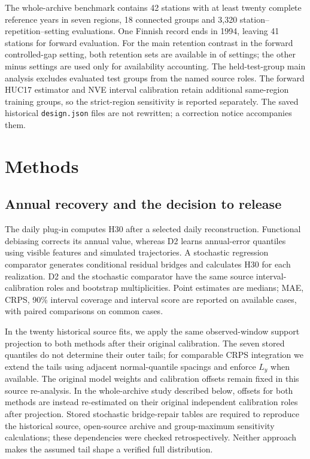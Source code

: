\documentclass[draft,linenumbers]{agujournal2025}
\begin{document}
The whole-archive benchmark contains 42 stations with at least twenty complete reference years in seven regions, 18 connected groups and 3,320 station--repetition--setting evaluations. One Finnish record ends in 1994, leaving 41 stations for forward evaluation. For the main retention contrast in the forward controlled-gap setting, both retention sets are available in \CCCohortCommon{} of \CCCohortAll{} settings; the other \CCCohortAll{} minus \CCCohortCommon{} settings are used only for availability accounting. The held-test-group main analysis excludes evaluated test groups from the named source roles. The forward HUC17 estimator and NVE interval calibration retain additional same-region training groups, so the strict-region sensitivity is reported separately. The saved historical \texttt{design.json} files are not rewritten; a correction notice accompanies them.



\section{Methods}
\subsection{Annual recovery and the decision to release}
The daily plug-in computes H30 after a selected daily reconstruction. Functional debiasing corrects its annual value, whereas D2 learns annual-error quantiles using visible features and simulated trajectories. A stochastic regression comparator generates conditional residual bridges and calculates H30 for each realization. D2 and the stochastic comparator have the same source interval-calibration roles and bootstrap multiplicities. Point estimates are medians; MAE, CRPS, 90\% interval coverage and interval score are reported on available cases, with paired comparisons on common cases.

In the twenty historical source fits, we apply the same observed-window support projection to both methods after their original calibration. The seven stored quantiles do not determine their outer tails; for comparable CRPS integration we extend the tails using adjacent normal-quantile spacings and enforce $L_y$ when available. The original model weights and calibration offsets remain fixed in this source re-analysis. In the whole-archive study described below, offsets for both methods are instead re-estimated on their original independent calibration roles after projection. Stored stochastic bridge-repair tables are required to reproduce the historical source, open-source archive and group-maximum sensitivity calculations; these dependencies were checked retrospectively. Neither approach makes the assumed tail shape a verified full distribution.
\end{document}
